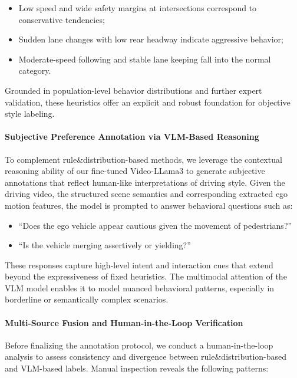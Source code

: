 \documentclass{article}
\begin{document}
\begin{itemize}[leftmargin=1em, topsep=0pt, itemsep=1pt]
    \item Low speed and wide safety margins at intersections correspond to conservative tendencies;
    \item Sudden lane changes with low rear headway indicate aggressive behavior;
    \item Moderate-speed following and stable lane keeping fall into the normal category.
\end{itemize}

\noindent Grounded in population-level behavior distributions and further expert validation, these heuristics offer an explicit and robust foundation for objective style labeling.


\paragraph{Subjective Preference Annotation via VLM-Based Reasoning}
To complement rule\&distribution-based methods, we leverage the contextual reasoning ability of our fine-tuned Video-LLama3 to generate subjective annotations that reflect human-like interpretations of driving style. Given the driving video, the structured scene semantics and corresponding extracted ego motion features, the model is prompted to answer behavioral questions such as:
\begin{itemize}[leftmargin=1em, topsep=0pt, itemsep=0.5pt]
    \item “Does the ego vehicle appear cautious given the movement of pedestrians?”
    \item “Is the vehicle merging assertively or yielding?”
\end{itemize}
These responses capture high-level intent and interaction cues that extend beyond the expressiveness of fixed heuristics. The multimodal attention of the VLM model enables it to model nuanced behavioral patterns, especially in borderline or semantically complex scenarios.

\paragraph{Multi-Source Fusion and Human-in-the-Loop Verification}
Before finalizing the annotation protocol, we conduct a human-in-the-loop analysis to assess consistency and divergence between rule\&distribution-based and VLM-based labels. Manual inspection reveals the following patterns:
\end{document}

